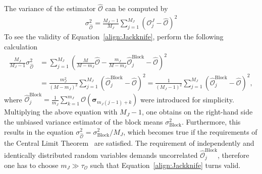 The variance of the estimator $\hat{\mathcal{O}}$ can be computed by
\begin{align}
    \sigma^2_{\hat{\mathcal{O}}}=\frac{M_J\!-\!1}{M_J}\sum_{j=1}^{M_J}\left(\mathcal{O}^J_j-\hat{\mathcal{O}}\right)^2
    \label{align:Jackknife}
\end{align}
To see the validity of Equation~\eqref{align:Jackknife}, perform the following calculation
\begin{align*}
    \frac{M_J}{M_J\!-\!1}\sigma^2_{\hat{\mathcal{O}}} &= \sum_{j=1}^{M_J}\left(\frac{M}{M\!-\!m_J}\hat{\mathcal{O}}
                                                                              -\frac{m_J}{M\!-\!m_J}\hat{\mathcal{O}}^\text{Block}_j
                                                                              -\hat{\mathcal{O}}\right)^2\\
                                                      &= \frac{m_J^2}{(M\!-\!m_J)^2}\sum_{j=1}^{M_J}\left(\hat{\mathcal{O}}^\text{Block}_j\!-\!\hat{\mathcal{O}}\right)^2
                                                       = \frac{1}{(M_J\!-\!1)^2}\sum_{j=1}^{M_J}\left(\hat{\mathcal{O}}^\text{Block}_j\!-\!\hat{\mathcal{O}}\right)^2,
\end{align*}
where $\hat{\mathcal{O}}^\text{Block}_j\!=\!\frac{1}{m_J}\sum_{k=1}^{m_J}\mathcal{O}(\bm{\sigma}_{m_J(j\!-\!1)\!+\!k})$ 
were introduced for simplicity. Multiplying the above equation with  $M_J\!-\!1$, one obtains on the right-hand side the unbiased variance estimator 
of the block means $\sigma^2_\text{Block}$. Furthermore, this results in the equation 
$\sigma^2_{\hat{\mathcal{O}}}=\sigma^2_\text{Block}/M_J$, which becomes true if the requirements of the Central Limit Theorem~\cite[p.246]{Behrends2013} 
are satisfied. The requirement of independently and identically distributed random variables demands uncorrelated
$\hat{\mathcal{O}}^\text{Block}_j$, therefore one has to choose $m_J\gg\tau_\mathcal{O}$ such that Equation~\eqref{align:Jackknife} turns valid.~\cite{Janke2012} 
